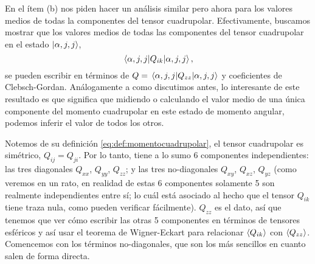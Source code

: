 \documentclass[10pt, a4paper]{article}
\numberwithin{equation}{subsection}
\begin{document}
\bigbreak
En el ítem (b) nos piden hacer un análisis similar pero ahora para los valores
medios de todas la componentes del tensor cuadrupolar. Efectivamente, buscamos
mostrar que los valores medios de todas las componentes del tensor cuadrupolar
en el estado $\ket{\alpha,j,j}$,
\begin{equation}
  \expval{Q_{ik}}{\alpha,j,j},
\end{equation}
se pueden escribir en términos de $Q = \expval{Q_{zz}}{\alpha,j,j}$ y
coeficientes de Clebsch-Gordan. Análogamente a como discutimos antes, lo
interesante de este resultado es que significa que midiendo o calculando el
valor medio de una única componente del momento cuadrupolar en este estado de
momento angular, podemos inferir el valor de todos los otros.

Notemos de su definición \eqref{eq:def:momentocuadrupolar}, el tensor
cuadrupolar es simétrico, $Q_{ij} = Q_{ji}$. Por lo tanto, tiene a lo sumo 6
componentes independientes: las tres diagonales $Q_{xx}$, $Q_{yy}$, $Q_{zz}$; y
las tres no-diagonales $Q_{xy}$, $Q_{xz}$, $Q_{yz}$ (como veremos en un rato,
en realidad de estas 6 componentes solamente 5 son realmente independientes
entre sí; lo cuál está asociado al hecho que el tensor $Q_{ik}$ tiene traza
nula, como pueden verificar fácilmente). $Q_{zz}$ es el dato, así que tenemos
que ver cómo escribir las otras 5 componentes en términos de tensores esféricos
y así usar el teorema de Wigner-Eckart para relacionar $\expval{Q_{ik}}$ con
$\expval{Q_{zz}}$. Comencemos con los términos no-diagonales, que son los más
sencillos en cuanto salen de forma directa.
\end{document}

